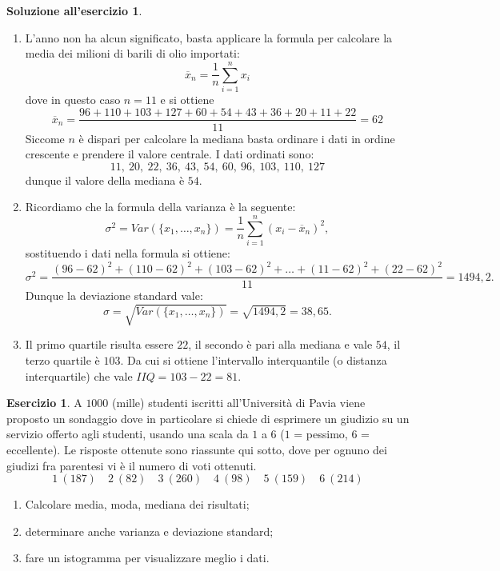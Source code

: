 \documentclass[12pt,a4paper]{article}
\theoremstyle{definition}
\newtheorem{sol}{Soluzione all'esercizio}
\newtheorem{exe}{Esercizio}
\begin{document}
\begin{sol}\mbox{}\vspace{-0.7cm}\\
	\begin{enumerate}
		\item L'anno non ha alcun significato, basta applicare la formula per calcolare la media dei milioni di barili di olio importati:
		      \[ \overline{x}_n = \frac1n \sum_{i=1}^{n}x_i \]
		      dove in questo caso $ n=11 $ e si ottiene
		      \[ \overline{x}_n = \frac{96+110+103+127+60+54+43+36+20+11+22}{11} = 62 \]
		      Siccome $ n $ è dispari per calcolare la mediana basta ordinare i dati in ordine crescente e prendere il valore centrale. I dati ordinati sono:
		      \[ 11,\ 20,\ 22,\  36,\ 43,\ 54,\ 60,\ 96,\ 103,\ 110,\ 127 \]
		      dunque il valore della mediana è $ 54 $.
		\item Ricordiamo che la formula della varianza è la seguente:
		      \[ \sigma^2 = Var(\{x_1, \dots, x_n\}) = \frac1n \sum_{i=1}^{n}(x_i-\overline{x}_n)^2, \]
		      sostituendo i dati nella formula si ottiene:
		      \[ \sigma^2 = \frac{(96-62)^2+(110-62)^2+(103-62)^2+\dots+(11-62)^2+(22-62)^2}{11} =1494,2 . \]
		      Dunque la deviazione standard vale:
		      \[ \sigma = \sqrt{Var(\{x_1, \dots, x_n\})} = \sqrt{1494,2} = 38,65 .\]
		\item Il primo quartile risulta essere $ 22 $, il secondo è pari alla mediana e vale $ 54 $, il terzo quartile è $ 103 $. Da cui si ottiene l'intervallo interquantile (o distanza interquartile) che vale $ IIQ = 103-22 = 81. $
	\end{enumerate}
\end{sol}

\begin{exe}
	A $ 1000 $ (mille) studenti iscritti all'Università di Pavia viene proposto un sondaggio dove in particolare si chiede di esprimere un giudizio su un servizio offerto agli studenti, usando una scala da
	$ 1 $ a $ 6 $ ($ 1 $ = pessimo, $ 6 $ = eccellente). Le risposte ottenute sono riassunte qui sotto, dove per ognuno dei
	giudizi fra parentesi vi è il numero di voti ottenuti.
	\[
		1\ (187)\quad 2\ (82)\quad 3\ (260)\quad 4\ (98)\quad 5\ (159)\quad 6\ (214) \]
	\begin{enumerate}
		\item  Calcolare media, moda, mediana dei risultati;
		\item  determinare anche varianza e deviazione standard;
		\item  fare un istogramma per visualizzare meglio i dati.
	\end{enumerate}
\end{exe}
\end{document}
